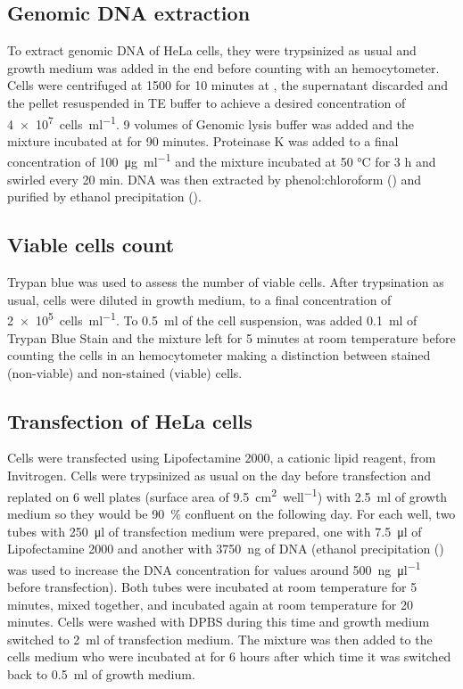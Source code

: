   \subsection{Genomic DNA extraction}
    To extract genomic DNA of HeLa cells, they were trypsinized as usual and
    growth medium was added in the end before counting with an hemocytometer.
    Cells were centrifuged at \SI{1500}{\gn} for 10 minutes at , the supernatant discarded
    and the pellet resuspended in TE buffer to achieve a desired concentration of
    \SI{4e7}{cells\per\ml}. 9 volumes of Genomic lysis buffer was added and the mixture
    incubated at  for 90 minutes. Proteinase K was added to a final concentration of
    \SI{100}{\ug\per\ml} and the mixture incubated at 50 °C for 3 h and swirled every 20 min.
    DNA was then extracted by phenol:chloroform () and purified by ethanol
    precipitation ().

  \subsection{Viable cells count}
    Trypan blue was used to assess the number of viable cells. After trypsination
    as usual, cells were diluted in growth medium, to a final concentration of \SI{2e5}{cells\per\ml}.
    To \SI{0.5}{\ml} of the cell suspension, was added \SI{0.1}{\ml} of  Trypan
    Blue Stain and the mixture left for 5 minutes at room temperature before counting
    the cells in an hemocytometer making a distinction between stained (non-viable)
    and non-stained (viable) cells.

  \subsection{Transfection of HeLa cells}
    Cells were transfected using Lipofectamine 2000, a cationic lipid reagent, from
    Invitrogen. Cells were trypsinized as usual on the day before transfection and
    replated on 6 well plates (surface area of \SI{9.5}{\square\cm\per well}) with \SI{2.5}{\ml} of growth
    medium so they would be \SI{90}{\percent} confluent on the following day. For each well,
    two tubes with \SI{250}{\ul} of transfection medium were prepared, one with \SI{7.5}{\ul}
    of Lipofectamine 2000 and another with \SI{3750}{\ng} of DNA (ethanol precipitation
    () was used to increase the DNA concentration for values around \SI{500}{\ng\per\ul}
    before transfection). Both tubes were incubated at room temperature for 5 minutes,
    mixed together, and incubated again at room temperature for 20 minutes. Cells
    were washed with DPBS during this time and growth medium switched to \SI{2}{\ml}
    of transfection medium. The mixture was then added to the cells medium who
    were incubated at  for 6 hours after which time it was switched back to
    \SI{0.5}{\ml} of growth medium.

